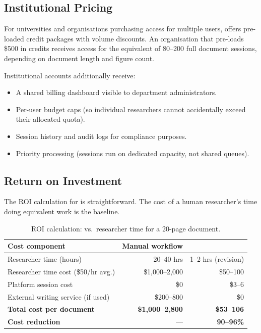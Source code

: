 \subsection{Institutional Pricing}

For universities and organisations purchasing access for multiple users,
\sys{} offers pre-loaded credit packages with volume discounts.
An organisation that pre-loads \$500 in credits receives access for the equivalent
of 80--200 full document sessions, depending on document length and figure count.

Institutional accounts additionally receive:
\begin{itemize}
  \item A shared billing dashboard visible to department administrators.
  \item Per-user budget caps (so individual researchers cannot accidentally
        exceed their allocated quota).
  \item Session history and audit logs for compliance purposes.
  \item Priority processing (sessions run on dedicated capacity, not shared queues).
\end{itemize}

\subsection{Return on Investment}

The ROI calculation for \sys{} is straightforward.
The cost of a human researcher's time doing equivalent work is the baseline.

\begin{table}[h!]
\centering
\caption{ROI calculation: \sys{} vs.\ researcher time for a 20-page document.}
\label{tab:roi}
\begin{tabular}{lrr}
\toprule
Cost component & Manual workflow & \sys{} \\
\midrule
Researcher time (hours)              & 20--40 hrs & 1--2 hrs (revision) \\
Researcher time cost (\$50/hr avg.)  & \$1,000--2,000 & \$50--100 \\
Platform session cost                & \$0 & \$3--6 \\
External writing service (if used)   & \$200--800 & \$0 \\
\midrule
\textbf{Total cost per document}     & \textbf{\$1,000--2,800} & \textbf{\$53--106} \\
\midrule
\textbf{Cost reduction}              & — & \textbf{90--96\%} \\
\bottomrule
\end{tabular}
\end{table}

